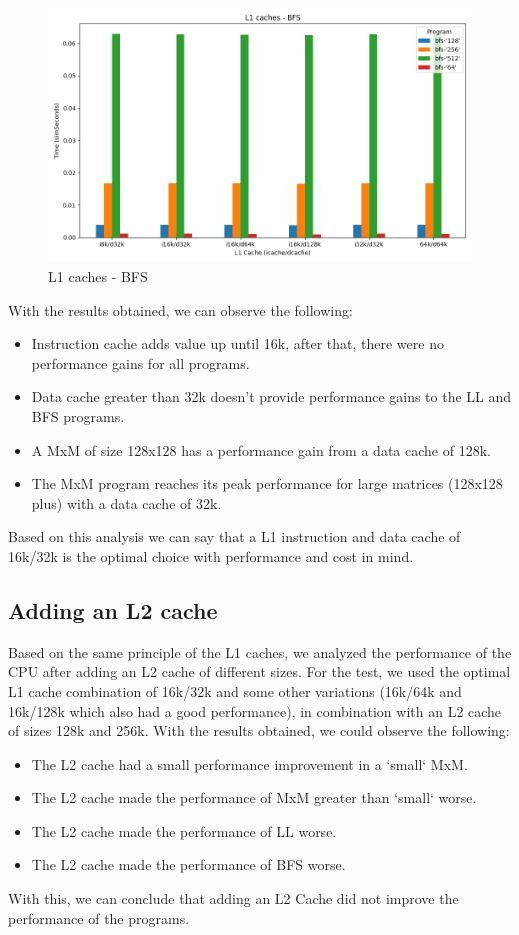 \documentclass[
	article,			%
	11pt,				%
	oneside,			%
	a4paper,			%
	brazil,				%
        english,			%
	sumario=tradicional
	]{abntex2}
\begin{document}
\begin{figure}[H]
\caption{L1 caches - BFS}
\label{fig:caches-bfs}
\includegraphics[width=\textwidth]{images/caches-bfs.png}
\end{figure}

With the results obtained, we can observe the following:
\begin{itemize}
    \item Instruction cache adds value up until 16k, after that, there were no performance gains for all programs.
    \item Data cache greater than 32k doesn't provide performance gains to the LL and BFS programs.
    \item A MxM of size 128x128 has a performance gain from a data cache of 128k.
    \item The MxM program reaches its peak performance for large matrices (128x128 plus) with a data cache of 32k.
\end{itemize}

Based on this analysis we can say that a L1 instruction and data cache of 16k/32k is the optimal choice with performance and cost in mind.

\subsection{Adding an L2 cache}
Based on the same principle of the L1 caches, we analyzed the performance of the CPU after adding an L2 cache of different sizes. For the test, we used the optimal L1 cache combination of 16k/32k and some other variations (16k/64k and 16k/128k which also had a good performance), in combination with an L2 cache of sizes 128k and 256k. With the results obtained, we could observe the following:
\begin{itemize}
    \item The L2 cache had a small performance improvement in a `small` MxM.
    \item The L2 cache made the performance of MxM greater than `small` worse.
    \item The L2 cache made the performance of LL worse.
    \item The L2 cache made the performance of BFS worse.
\end{itemize}
With this, we can conclude that adding an L2 Cache did not improve the performance of the programs.
\end{document}
